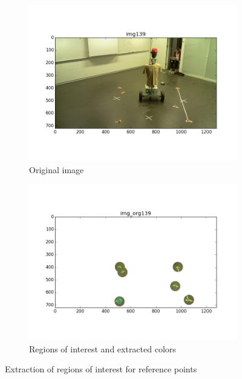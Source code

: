 \begin{figure}[htb]
	\centering
	\begin{subfigure}[b]{0.49\linewidth}
        \centering
		\includegraphics[width=\linewidth]{files/_img139_cvt.png}
		\caption{Original image}
		\label{fig:img}
	\end{subfigure}
	\begin{subfigure}[b]{0.49\linewidth}
        \centering
		\includegraphics[width=\linewidth]{files/_img_org139.png}
		\caption{Regions of interest and extracted colors}
		\label{fig:img_org}
	\end{subfigure}
    \caption{Extraction of regions of interest for reference points} 
\end{figure}

